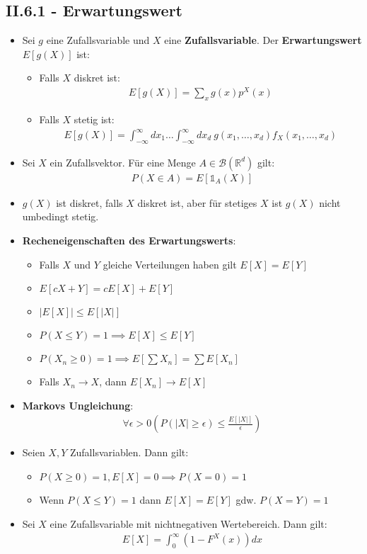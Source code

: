 \documentclass{scrartcl}
\newcommand{\borel}{\mc{B}(\mathbb{R}^d)}
\newcommand{\mc}[1]{\mathcal{#1}}
\begin{document}
\subsection*{II.6.1 - Erwartungswert}
\begin{itemize}
    \item Sei $g$ eine Zufallsvariable und $X$ eine \textbf{Zufallsvariable}. Der \textbf{Erwartungswert} $E[g(X)]$ ist:
    \begin{itemize}
        \item Falls $X$ diskret ist:
        \begin{align*}
            E[g(X)] = \sum_x g(x)p^X(x)   
        \end{align*}
        \item Falls $X$ stetig ist:
        \begin{align*}
        E[g(X)] = \int_{-\infty}^\infty dx_1 \hdots \int_{-\infty}^\infty dx_d\ g(x_1, \hdots, x_d) f_X(x_1, \hdots, x_d) 
    \end{align*}
    \end{itemize}
    \item Sei $X$ ein Zufallsvektor. Für eine Menge $A \in \borel$ gilt:
    \begin{align*}
        P(X \in A) = E[\mathbb{1}_A(X)]
    \end{align*}
    \item $g(X)$ ist diskret, falls $X$ diskret ist, aber für stetiges $X$ ist $g(X)$ nicht umbedingt stetig.
    \item \textbf{Recheneigenschaften des Erwartungswerts}:
    \begin{itemize}
        \item Falls $X$ und $Y$ gleiche Verteilungen haben gilt $E[X] = E[Y]$
        \item $E[cX+Y] = cE[X] + E[Y]$
        \item $|E[X]| \leq E[|X|]$
        \item $P(X \leq Y) = 1 \implies E[X] \leq E[Y]$
        \item $P(X_n \geq 0) = 1 \implies E[\sum X_n] = \sum E[X_n]$
        \item Falls $X_n \to X$, dann $E[X_n] \to E[X]$
    \end{itemize}
    \item \textbf{Markovs Ungleichung}:
    \begin{align*}
        \forall \epsilon > 0 \left(P\left(|X| \geq \epsilon\right) \leq \frac{E[|X|]}{\epsilon}\right)
    \end{align*}
    \item Seien $X,Y$ Zufallsvariablen. Dann gilt:
    \begin{itemize}
        \item $P(X \geq 0) = 1, E[X] = 0 \implies P(X = 0) = 1$
        \item Wenn $P(X \leq Y) = 1$ dann $E[X] = E[Y]$ gdw. $P(X = Y) = 1$
    \end{itemize}
    \item Sei $X$ eine Zufallsvariable mit nichtnegativen Wertebereich. Dann gilt:
    \begin{align*}
        E[X] = \int_{0}^{\infty}(1-F^X(x))dx
    \end{align*}
\end{itemize}
\end{document}
